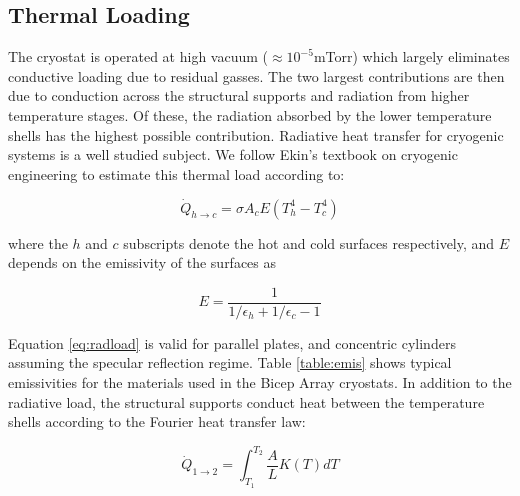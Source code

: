 \documentclass[12pt]{article}
\begin{document}
\subsection{Thermal Loading}
The cryostat is operated at high vacuum ($\approx 10^{-5}$mTorr) which largely
eliminates conductive loading due to residual gasses. The two largest
contributions are then due to conduction across the structural supports and
radiation from higher temperature stages. Of these, the radiation absorbed by
the lower temperature shells has the highest possible contribution. Radiative
heat transfer for cryogenic systems is a well studied subject. We follow
Ekin's textbook \cite{cite:Ekin} on cryogenic engineering to estimate this thermal load
according to:

\begin{equation}
	\dot{Q}_{h\rightarrow c}=\sigma A_{c} E (T_{h}^4 - T_{c}^4)
	\label{eq:radload}
\end{equation}

where the $h$ and $c$ subscripts denote the hot and cold surfaces
respectively, and $E$ depends on the emissivity of the surfaces as

\begin{equation}
	E=\frac{1}{1/\epsilon _h + 1/\epsilon _c - 1}
\end{equation}

Equation \ref{eq:radload} is valid for parallel plates, and concentric
cylinders assuming the specular reflection regime. Table \ref{table:emis} shows
typical emissivities for the materials used in the Bicep Array cryostats. In
addition to the radiative load, the structural supports conduct heat between
the temperature shells according to the Fourier heat transfer law:


\begin{equation}
	\dot{Q}_{1\rightarrow 2}=\int _{T_1} ^{T_2} \frac{A}{L}K(T)dT
	\label{eq:conduction}
\end{equation}
\end{document}
